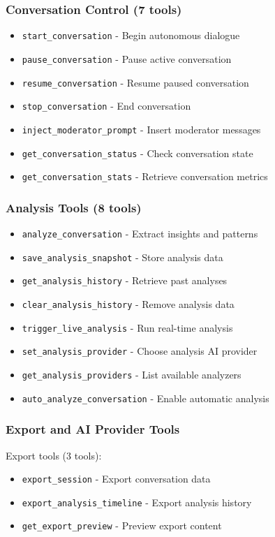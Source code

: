 \documentclass[11pt,letterpaper]{article}
\begin{document}
\subsubsection{Conversation Control (7 tools)}
\begin{itemize}
    \item \texttt{start\_conversation} - Begin autonomous dialogue
    \item \texttt{pause\_conversation} - Pause active conversation
    \item \texttt{resume\_conversation} - Resume paused conversation
    \item \texttt{stop\_conversation} - End conversation
    \item \texttt{inject\_moderator\_prompt} - Insert moderator messages
    \item \texttt{get\_conversation\_status} - Check conversation state
    \item \texttt{get\_conversation\_stats} - Retrieve conversation metrics
\end{itemize}

\subsubsection{Analysis Tools (8 tools)}
\begin{itemize}
    \item \texttt{analyze\_conversation} - Extract insights and patterns
    \item \texttt{save\_analysis\_snapshot} - Store analysis data
    \item \texttt{get\_analysis\_history} - Retrieve past analyses
    \item \texttt{clear\_analysis\_history} - Remove analysis data
    \item \texttt{trigger\_live\_analysis} - Run real-time analysis
    \item \texttt{set\_analysis\_provider} - Choose analysis AI provider
    \item \texttt{get\_analysis\_providers} - List available analyzers
    \item \texttt{auto\_analyze\_conversation} - Enable automatic analysis
\end{itemize}

\subsubsection{Export and AI Provider Tools}
Export tools (3 tools):
\begin{itemize}
    \item \texttt{export\_session} - Export conversation data
    \item \texttt{export\_analysis\_timeline} - Export analysis history
    \item \texttt{get\_export\_preview} - Preview export content
\end{itemize}
\end{document}
